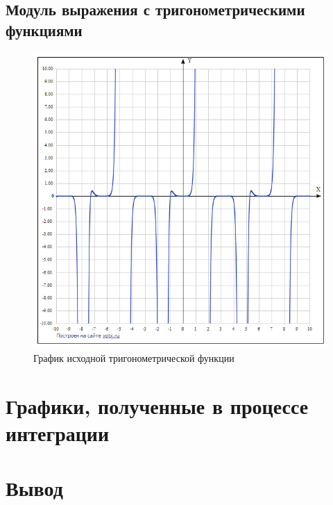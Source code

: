\documentclass[a4paper,10pt]{article}
\begin{document}
    \subsection*{Модуль выражения с тригонометрическими функциями}
    	\begin{figure}[h!]
			\caption{График исходной тригонометрической функции}
			\includegraphics[scale=0.5]{./images/trigExpr.png}
		\end{figure} 
\section*{Графики, полученные в процессе интеграции}
\section*{Вывод}
\end{document}
